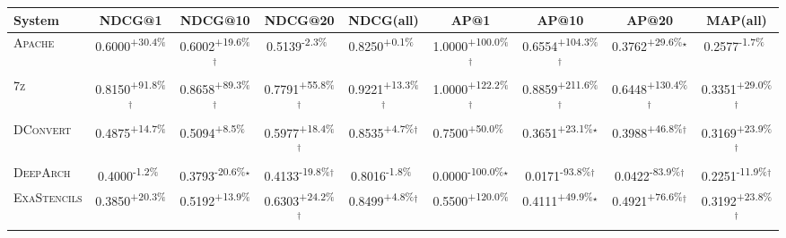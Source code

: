 \begin{table}[htbp]
\centering
\renewcommand{\arraystretch}{1.2}
\begin{tabular}{l|cccc|cccc}
\hline
System & NDCG@1 & NDCG@10 & NDCG@20 & NDCG(all) & AP@1 & AP@10 & AP@20 & MAP(all) \\ \hline
\textsc{Apache} & \cellcolor{green!30}0.6000\textsuperscript{+30.4\%}$^{\,\,\,}$ & \cellcolor{green!30}0.6002\textsuperscript{+19.6\%}$^\dagger$ & \cellcolor{red!30}0.5139\textsuperscript{-2.3\%}$^{\,\,\,}$ & \cellcolor{green!30}0.8250\textsuperscript{+0.1\%}$^{\,\,\,}$ & \cellcolor{green!30}1.0000\textsuperscript{+100.0\%}$^\dagger$ & \cellcolor{green!30}0.6554\textsuperscript{+104.3\%}$^\dagger$ & \cellcolor{green!30}0.3762\textsuperscript{+29.6\%}$^\star$ & \cellcolor{red!30}0.2577\textsuperscript{-1.7\%}$^{\,\,\,}$ \\
\textsc{7z} & \cellcolor{green!30}0.8150\textsuperscript{+91.8\%}$^\dagger$ & \cellcolor{green!30}0.8658\textsuperscript{+89.3\%}$^\dagger$ & \cellcolor{green!30}0.7791\textsuperscript{+55.8\%}$^\dagger$ & \cellcolor{green!30}0.9221\textsuperscript{+13.3\%}$^\dagger$ & \cellcolor{green!30}1.0000\textsuperscript{+122.2\%}$^\dagger$ & \cellcolor{green!30}0.8859\textsuperscript{+211.6\%}$^\dagger$ & \cellcolor{green!30}0.6448\textsuperscript{+130.4\%}$^\dagger$ & \cellcolor{green!30}0.3351\textsuperscript{+29.0\%}$^\dagger$ \\
\textsc{DConvert} & \cellcolor{green!30}0.4875\textsuperscript{+14.7\%}$^{\,\,\,}$ & \cellcolor{green!30}0.5094\textsuperscript{+8.5\%}$^{\,\,\,}$ & \cellcolor{green!30}0.5977\textsuperscript{+18.4\%}$^\dagger$ & \cellcolor{green!30}0.8535\textsuperscript{+4.7\%}$^\dagger$ & \cellcolor{green!30}0.7500\textsuperscript{+50.0\%}$^{\,\,\,}$ & \cellcolor{green!30}0.3651\textsuperscript{+23.1\%}$^\star$ & \cellcolor{green!30}0.3988\textsuperscript{+46.8\%}$^\dagger$ & \cellcolor{green!30}0.3169\textsuperscript{+23.9\%}$^\dagger$ \\
\textsc{DeepArch} & \cellcolor{red!30}0.4000\textsuperscript{-1.2\%}$^{\,\,\,}$ & \cellcolor{red!30}0.3793\textsuperscript{-20.6\%}$^\star$ & \cellcolor{red!30}0.4133\textsuperscript{-19.8\%}$^\dagger$ & \cellcolor{red!30}0.8016\textsuperscript{-1.8\%}$^{\,\,\,}$ & \cellcolor{red!30}0.0000\textsuperscript{-100.0\%}$^\star$ & \cellcolor{red!30}0.0171\textsuperscript{-93.8\%}$^\dagger$ & \cellcolor{red!30}0.0422\textsuperscript{-83.9\%}$^\dagger$ & \cellcolor{red!30}0.2251\textsuperscript{-11.9\%}$^\dagger$ \\
\textsc{ExaStencils} & \cellcolor{green!30}0.3850\textsuperscript{+20.3\%}$^{\,\,\,}$ & \cellcolor{green!30}0.5192\textsuperscript{+13.9\%}$^{\,\,\,}$ & \cellcolor{green!30}0.6303\textsuperscript{+24.2\%}$^\dagger$ & \cellcolor{green!30}0.8499\textsuperscript{+4.8\%}$^\dagger$ & \cellcolor{green!30}0.5500\textsuperscript{+120.0\%}$^{\,\,\,}$ & \cellcolor{green!30}0.4111\textsuperscript{+49.9\%}$^\star$ & \cellcolor{green!30}0.4921\textsuperscript{+76.6\%}$^\dagger$ & \cellcolor{green!30}0.3192\textsuperscript{+23.8\%}$^\dagger$ \\

\end{tabular}
\end{table}
